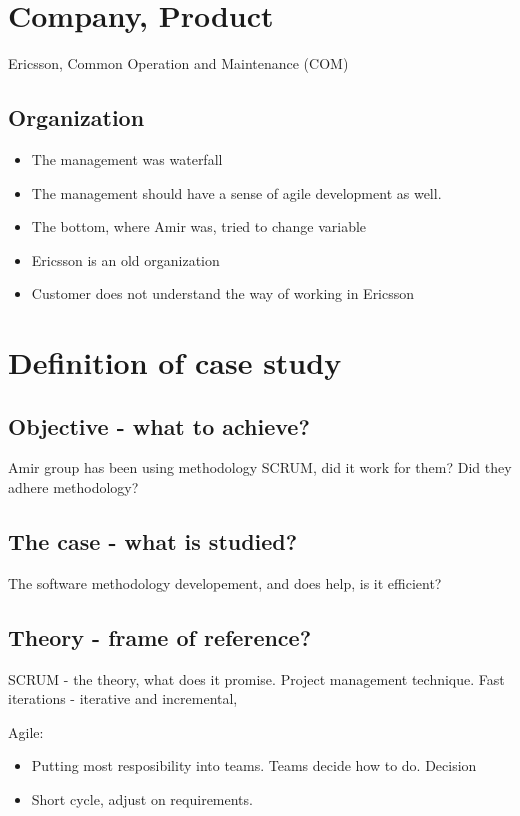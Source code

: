 \documentclass{article}
\begin{document}
\section{Company, Product}
Ericsson, Common Operation and Maintenance  (COM)

\subsection{Organization}

\begin{itemize}
\item The management was waterfall
\item The management should have a sense of agile development as well.
\item The bottom, where Amir was, tried to change variable
\item Ericsson is an old organization
\item Customer does not understand the way of working in Ericsson
\end{itemize}

\section{Definition of case study}

\subsection{Objective - what to achieve?}

Amir group has been using methodology SCRUM, did it work for them? Did
they adhere methodology?

\subsection{The case - what is studied?}

The software methodology developement, and does help, is it efficient?

\subsection{Theory - frame of reference?}

SCRUM - the theory, what does it promise. Project management
technique. Fast iterations - iterative and incremental,

Agile:
\begin{itemize}
\item Putting most resposibility into teams. Teams decide how to
  do. Decision
\item Short cycle, adjust on requirements.
\end{itemize}
\end{document}
